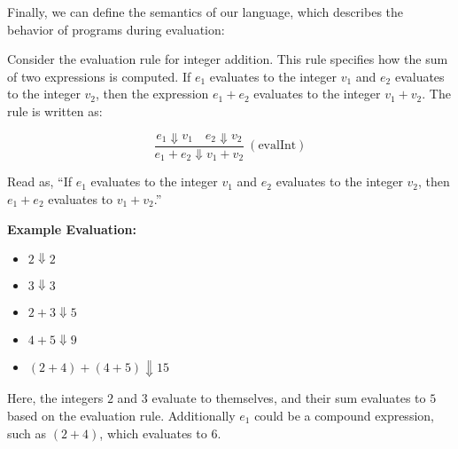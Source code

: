 \newpage 

\noindent
Finally, we can define the semantics of our language, which describes the behavior of programs during evaluation:

\begin{Example}

    \label{ex:eval_integer_addition}
    Consider the evaluation rule for integer addition. This rule specifies how the sum of two expressions is computed. 
    If $e_1$ evaluates to the integer $v_1$ and $e_2$ evaluates to the integer $v_2$, 
    then the expression $e_1 + e_2$ evaluates to the integer $v_1 + v_2$. The rule is written as: \LARGE

    \[
    \frac{e_1 \Downarrow v_1 \quad e_2 \Downarrow v_2}{e_1 + e_2 \Downarrow v_1 + v_2} \ (\text{evalInt})
    \]

    \vspace{.5em}
    \normalsize
    \noindent
    Read as, ``If $e_1$ evaluates to the integer $v_1$ and $e_2$ evaluates to the integer $v_2$, 
    then $e_1 + e_2$ evaluates to $v_1 + v_2$.''

    \vspace{1em}
    \textbf{Example Evaluation:}
    \begin{itemize}
        \item $2 \Downarrow 2$
        \item $3 \Downarrow 3$
        \item $2 + 3 \Downarrow 5$
        \item $4 + 5 \Downarrow 9$
        \item $(2 + 4) + (4 + 5) \Downarrow 15$
    \end{itemize}

    \noindent
    Here, the integers $2$ and $3$ evaluate to themselves, and their sum evaluates to $5$ based on the evaluation rule.
    Additionally $e_1$ could be a compound expression, such as $(2 + 4)$, which evaluates to $6$.
\end{Example}

